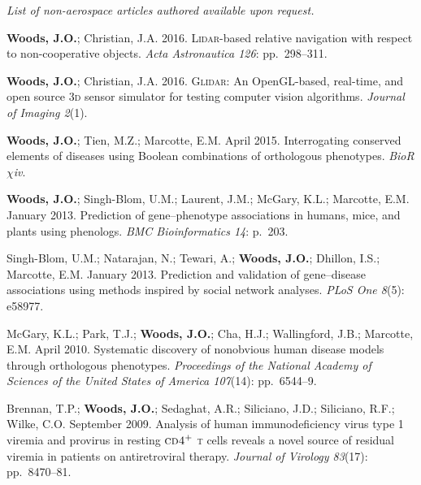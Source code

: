 \documentclass[12pt,letterpaper]{article}
\newcommand{\mhead}[1]{\leavevmode\marginpar{\sffamily\footnotesize #1}}
\begin{document}
\bigskip
\mhead{Highlighted \\ Articles}%
\par\vspace{-\baselineskip}\textit{List of non-aerospace articles authored available upon request.}

\medskip
\par\textbf{Woods, J.O.}; Christian, J.A. 2016. \textsc{Lidar}-based relative navigation with respect to non-cooperative objects. \textit{Acta Astronautica 126}: pp.\ 298--311.

\medskip
\par\textbf{Woods, J.O.}; Christian, J.A. 2016. \textsc{Glidar}: An OpenGL-based, real-time, and open source 3\textsc{d} sensor simulator for testing computer vision algorithms. \textit{Journal of Imaging 2}(1).

\medskip
\par\textbf{Woods, J.O.}; Tien, M.Z.; Marcotte, E.M. April 2015. Interrogating conserved elements of diseases using Boolean combinations of orthologous phenotypes. \textit{BioR$\chi$iv}.

\medskip
\par\textbf{Woods, J.O.}; Singh-Blom, U.M.; Laurent, J.M.; McGary, K.L.; Marcotte, E.M. January 2013. Prediction of gene--phenotype associations in humans, mice, and plants using phenologs. \textit{BMC Bioinformatics 14}: p.\ 203.

\medskip
\par Singh-Blom, U.M.; Natarajan, N.; Tewari, A.; \textbf{Woods, J.O.}; Dhillon, I.S.; Marcotte, E.M. January 2013. Prediction and validation of gene--disease associations using methods inspired by social network analyses. \textit{PLoS One 8}(5): e58977.

\medskip
\par McGary, K.L.; Park, T.J.; \textbf{Woods, J.O.}; Cha, H.J.; Wallingford, J.B.; Marcotte, E.M. April 2010. Systematic discovery of nonobvious human disease models through orthologous phenotypes. \textit{Proceedings of the National Academy of Sciences of the United States of America 107}(14): pp.\ 6544--9.

\medskip
\par Brennan, T.P.; \textbf{Woods, J.O.}; Sedaghat, A.R.; Siliciano, J.D.; Siliciano, R.F.; Wilke, C.O. September 2009. Analysis of human immunodeficiency virus type 1 viremia and provirus in resting $\textsc{cd4}^{+}$ \textsc{t} cells reveals a novel source of residual viremia in patients on antiretroviral therapy. \textit{Journal of Virology 83}(17): pp.\ 8470--81.
\end{document}
